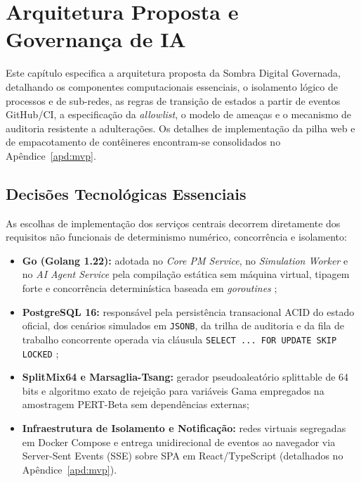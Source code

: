 \documentclass[12pt,openany,oneside,a4paper,english,brazilian,sumario=tradicional]{abntex2}
\begin{document}
\begin{enumerate}
\end{enumerate}

\chapter{Arquitetura Proposta e Governança de IA}\label{cap:arquitetura}

Este capítulo especifica a arquitetura proposta da Sombra Digital Governada, detalhando os componentes computacionais essenciais, o isolamento lógico de processos e de sub-redes, as regras de transição de estados a partir de eventos GitHub/CI, a especificação da \textit{allowlist}, o modelo de ameaças e o mecanismo de auditoria resistente a adulterações. Os detalhes de implementação da pilha web e de empacotamento de contêineres encontram-se consolidados no Apêndice~\ref{apd:mvp}.

\section{Decisões Tecnológicas Essenciais}

As escolhas de implementação dos serviços centrais decorrem diretamente dos requisitos não funcionais de determinismo numérico, concorrência e isolamento:

\begin{itemize}
  \item \textbf{Go (Golang 1.22):} adotada no \textit{Core PM Service}, no \textit{Simulation Worker} e no \textit{AI Agent Service} pela compilação estática sem máquina virtual, tipagem forte e concorrência determinística baseada em \textit{goroutines} \cite{donovan2015};
  \item \textbf{PostgreSQL 16:} responsável pela persistência transacional ACID do estado oficial, dos cenários simulados em \texttt{JSONB}, da trilha de auditoria e da fila de trabalho concorrente operada via cláusula \texttt{SELECT ... FOR UPDATE SKIP LOCKED} \cite{postgresql2024};
  \item \textbf{SplitMix64 e Marsaglia-Tsang:} gerador pseudoaleatório splittable de 64 bits \cite{steele2014,lecuyer2017} e algoritmo exato de rejeição para variáveis Gama \cite{marsaglia2000} empregados na amostragem PERT-Beta sem dependências externas;
  \item \textbf{Infraestrutura de Isolamento e Notificação:} redes virtuais segregadas em Docker Compose \cite{merkel2014} e entrega unidirecional de eventos ao navegador via Server-Sent Events (SSE) \cite{w3c2015} sobre SPA em React/TypeScript \cite{vite2024} (detalhados no Apêndice~\ref{apd:mvp}).
\end{itemize}
\end{document}
